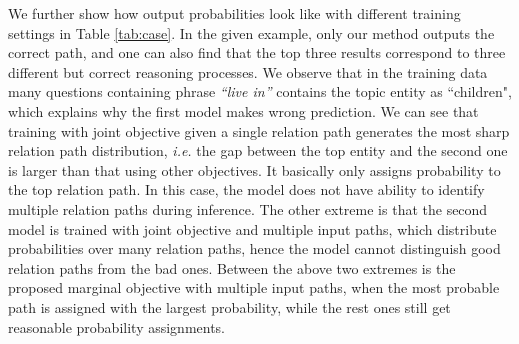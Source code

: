 
We further show how output probabilities look like with different training settings in Table \ref{tab:case}. In the given example, only our method outputs the correct path, and one can also find that the top three results correspond to three different but correct reasoning processes. We observe that in the training data many questions containing phrase \textit{``live in''} contains the topic entity as ``children", which explains why the first model makes wrong prediction. %
We can see that training with joint objective given a single relation path generates the most sharp relation path distribution, \emph{i.e.} the gap between the top entity and the second one is larger than that using other objectives. It basically only assigns probability to the top relation path. In this case, the model does not have ability to identify multiple relation paths during inference. The other extreme is that the second model is trained with joint objective and multiple input paths, which distribute probabilities over many relation paths, hence the model cannot distinguish good relation paths from the bad ones. Between the above two extremes is the proposed marginal objective with multiple input paths, when the most probable path is assigned with the largest probability, while the rest ones still get reasonable probability assignments. %



